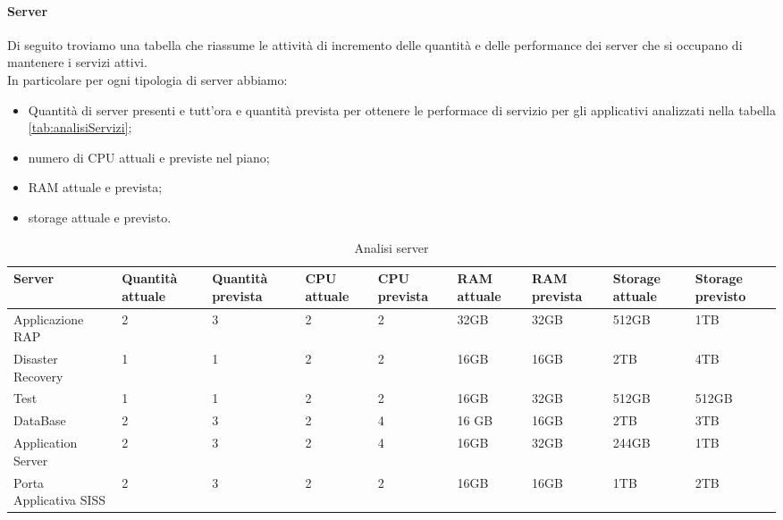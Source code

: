 	\paragraph{Server}
	Di seguito troviamo una tabella che riassume le attività di incremento delle quantità e delle performance dei server che si occupano di mantenere i servizi attivi.\\
	In particolare per ogni tipologia di server abbiamo:
	\begin{itemize}
		\item Quantità di server presenti e tutt'ora e quantità prevista per ottenere le performace di servizio per gli applicativi analizzati nella tabella \ref{tab:analisiServizi};
		\item numero di CPU attuali e previste nel piano;
		\item RAM attuale e prevista;
		\item storage attuale e previsto.
	\end{itemize}
	\begin{table}[h]
		\centering
		\begin{tabular}{|C{2cm} || C{1.5cm} | C{1.5cm}|| C{1.5cm} |C{1.5cm} || C{1.5cm} |C{1.5cm}|| C{1.5cm} |C{1.5cm}|} 
			\hline
			\textbf{Server}  &\textbf{Quantità attuale} &\textbf{Quantità prevista} & \textbf{CPU attuale} & \textbf{CPU prevista} & \textbf{RAM attuale} & \textbf{RAM prevista} & \textbf{Storage attuale} & \textbf{Storage previsto} \\ \hline
			Applicazione RAP & 2 & 3 & 2& 2& 32GB & 32GB & 512GB& 1TB \\ \hline
			Disaster Recovery & 1 & 1 & 2 & 2& 16GB& 16GB &2TB&4TB\\ \hline
			Test & 1 & 1& 2 &  2& 16GB& 32GB& 512GB&512GB\\ \hline
			DataBase & 2 & 3 & 2 & 4 & 16 GB & 16GB & 2TB& 3TB\\ \hline
			Application Server & 2 & 3 & 2 & 4 & 16GB&32GB & 244GB& 1TB\\ \hline
			Porta Applicativa SISS & 2 & 3 & 2 & 2& 16GB & 16GB & 1TB& 2TB \\ \hline
		\end{tabular}
		\caption{Analisi server}\label{tab:analisiServer}
	\end{table}



